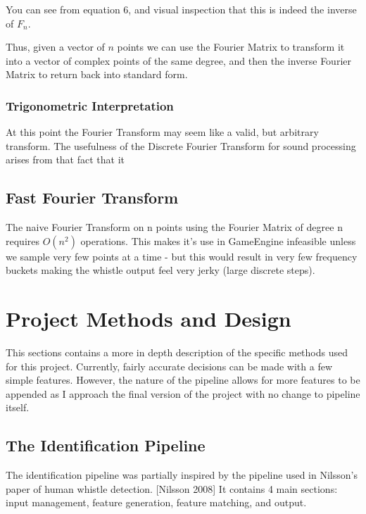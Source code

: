 \documentclass[DIV=calc, paper=a4, fontsize=11pt, twocolumn]{scrartcl}   %
\begin{document}
You can see from equation 6, and visual inspection that this is indeed the inverse of $F_{n}$.
\par Thus, given a vector of $n$ points we can use the Fourier Matrix to transform it into a vector of complex points of the same degree, and then the inverse Fourier Matrix to return back into standard form.
\subsubsection{Trigonometric Interpretation}

At this point the Fourier Transform may seem like a valid, but arbitrary transform. The usefulness of the Discrete Fourier Transform for sound processing arises from that fact that it


\subsection{Fast Fourier Transform}

The naive Fourier Transform on n points using the Fourier Matrix of degree n requires $O(n^2)$ operations. This makes it's use in GameEngine infeasible unless we sample very few points at a time - but this would result in very few frequency buckets making the whistle output feel very jerky (large discrete steps).


\section{Project Methods and Design}
   This sections contains a more in depth description of the specific methods used for this project. Currently, fairly accurate decisions can
   be made with a few simple features. However, the nature of the pipeline allows for more features to be appended as I approach the final version of the project with no change to pipeline itself.
\subsection{The Identification Pipeline}
   The identification pipeline was partially inspired by the pipeline used in Nilsson's paper of human whistle detection. [Nilsson 2008] It contains 4 main sections: input management, feature generation, feature matching, and output.
\end{document}
